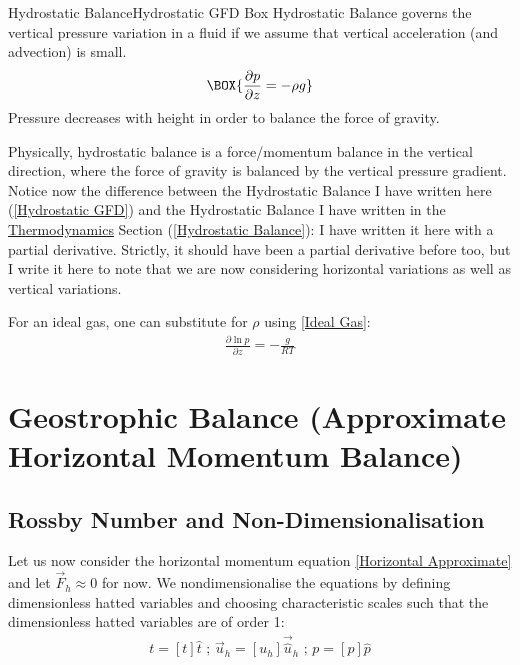 \begin{fact}{Hydrostatic Balance}{Hydrostatic GFD Box}\label{Hydrostatic GFD Box}
Hydrostatic Balance governs the vertical pressure variation in a fluid if we assume that vertical acceleration (and advection) is small.
    \begin{equation}\label{Hydrostatic GFD}
    \BOX{
        \frac{\partial p}{\partial z}=-\rho g
    }
    \end{equation}
Pressure decreases with height in order to balance the force of gravity.
\end{fact}

Physically, hydrostatic balance is a force/momentum balance in the vertical direction, where the force of gravity is balanced by the vertical pressure gradient. Notice now the difference between the Hydrostatic Balance I have written here (\ref{Hydrostatic GFD}) and the Hydrostatic Balance I have written in the \hyperref[Thermodynamics]{Thermodynamics} Section (\ref{Hydrostatic Balance}): I have written it here with a partial derivative. Strictly, it should have been a partial derivative before too, but I write it here to note that we are now considering horizontal variations as well as vertical variations.

For an ideal gas, one can substitute for $\rho$ using \ref{Ideal Gas}:
\begin{align}\label{Hydrostatic Ideal Gas}
    \boxed{\frac{\partial \ln p}{\partial z}=-\frac{g}{RT}}
\end{align}

\section{Geostrophic Balance (Approximate Horizontal Momentum Balance)}

\subsection{Rossby Number and Non-Dimensionalisation}

Let us now consider the horizontal momentum equation \ref{Horizontal Approximate} and let $\vec{F}_h\approx 0$ for now. We nondimensionalise the equations by defining dimensionless hatted variables and choosing characteristic scales such that the dimensionless hatted variables are of order 1:
\begin{align*}
    t=[t]\hat{t}\text{   ;   }
    \vec{u}_h=[u_h]\vec{\hat{u}}_h\text{   ;   }
    p=[p]\hat{p}
\end{align*}

